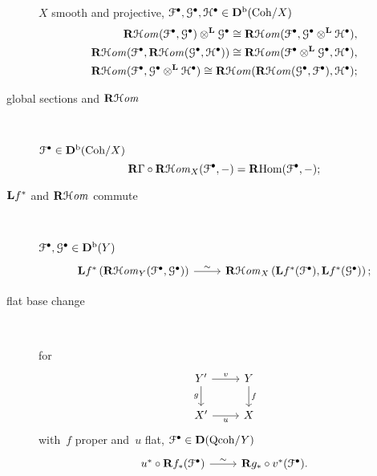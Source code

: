 \documentclass[10pt,a4paper]{article}
\begin{document}
\begin{description}
    $X$ smooth and projective, $\mathcal{F}^\bullet,\mathcal{G}^\bullet,\mathcal{H}^\bullet\in\mathbf{D}^{\mathrm{b}}(\mathrm{Coh}/X)$
    \begin{equation}
      \begin{aligned}
        \operatorname{\mathbf{R}\mathcal{H}\mathit{om}}(\mathcal{F}^\bullet,\mathcal{G}^\bullet)\otimes^{\mathbf{L}}\mathcal{G}^\bullet\cong\operatorname{\mathbf{R}\mathcal{H}\mathit{om}}(\mathcal{F}^\bullet,\mathcal{G}^\bullet\otimes^{\mathbf{L}}\mathcal{H}^\bullet), \\
        \operatorname{\mathbf{R}\mathcal{H}\mathit{om}}(\mathcal{F}^\bullet,\operatorname{\mathbf{R}\mathcal{H}\mathit{om}}(\mathcal{G}^\bullet,\mathcal{H}^\bullet))\cong\operatorname{\mathbf{R}\mathcal{H}\mathit{om}}(\mathcal{F}^\bullet\otimes^{\mathbf{L}}\mathcal{G}^\bullet,\mathcal{H}^\bullet), \\
        \operatorname{\mathbf{R}\mathcal{H}\mathit{om}}(\mathcal{F}^\bullet,\mathcal{G}^\bullet\otimes^{\mathbf{L}}\mathcal{H}^\bullet)\cong\operatorname{\mathbf{R}\mathcal{H}\mathit{om}}(\operatorname{\mathbf{R}\mathcal{H}\mathit{om}}(\mathcal{G}^\bullet,\mathcal{F}^\bullet),\mathcal{H}^\bullet);
      \end{aligned}
    \end{equation}

  \item[global sections and $\operatorname{\mathbf{R}\mathcal{H}\mathit{om}}$] {\ }
    
    $\mathcal{F}^\bullet\in\mathbf{D}^{\mathrm{b}}(\mathrm{Coh}/X)$
    \begin{equation}
      \mathbf{R}\Gamma\circ\operatorname{\mathbf{R}\mathcal{H}\mathit{om}}_X(\mathcal{F}^\bullet,-)=\operatorname{\mathbf{R}Hom}(\mathcal{F}^\bullet,-);
    \end{equation}

  \item[$\mathbf{L} f^*$ and $\operatorname{\mathbf{R}\mathcal{H}\mathit{om}}$ commute] {\ }
    
    $\mathcal{F}^\bullet,\mathcal{G}^\bullet\in\mathbf{D}^{\mathrm{b}}(Y)$
    \begin{equation}
      \begin{tikzcd}
        \LLL f^*\left( \RRRHHom_Y(\mathcal{F}^\bullet,\mathcal{G}^\bullet) \right) \arrow{r}{\sim} & \RRRHHom_X\left( \LLL f^*(\mathcal{F}^\bullet),\LLL f^*(\mathcal{G}^\bullet) \right);
      \end{tikzcd}
    \end{equation}

  \item[flat base change] {\ }

    for
    \begin{equation}
      \begin{tikzcd}
        Y' \arrow[swap]{d}{g} \arrow{r}{v} & Y \arrow{d}{f} \\
        X' \arrow[swap]{r}{u} & X
      \end{tikzcd}
    \end{equation}
    with~$f$ proper and~$u$ flat, $\mathcal{F}^\bullet\in\mathbf{D}(\mathrm{Qcoh}/Y)$
    \begin{equation}
      \begin{tikzcd}
        u^*\circ\RRR f_*(\mathcal{F}^\bullet) \arrow{r}{\sim} & \RRR g_*\circ v^*(\mathcal{F}^\bullet).
      \end{tikzcd}
    \end{equation}
\end{description}
\end{document}
